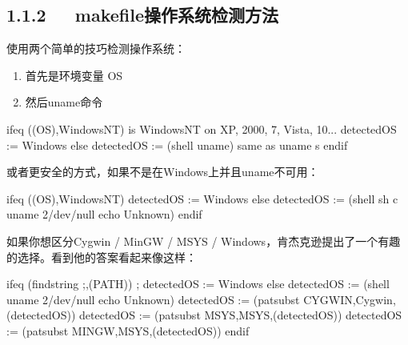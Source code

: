 \documentclass[letterpaper,12pt,english]{sphinxmanual}
\begin{document}
\subsection{1.1.2   makefile操作系统检测方法}
\label{\detokenize{004.study/001._u7f16_u7a0b/001.make/makefile:id3}}
使用两个简单的技巧检测操作系统：
\begin{enumerate}
%
\item {} 
首先是环境变量 OS

\item {} 
然后uname命令

\end{enumerate}

\begin{sphinxVerbatim}[commandchars=\\\{\}]
ifeq (\PYGZdl{}(OS),Windows\PYGZus{}NT)     \PYGZsh{} is Windows\PYGZus{}NT on XP, 2000, 7, Vista, 10...
    detected\PYGZus{}OS := Windows
else
    detected\PYGZus{}OS := \PYGZdl{}(shell uname)  \PYGZsh{} same as \PYGZdq{}uname \PYGZhy{}s\PYGZdq{}
endif
\end{sphinxVerbatim}

或者更安全的方式，如果不是在Windows上并且uname不可用：

\begin{sphinxVerbatim}[commandchars=\\\{\}]
ifeq (\PYGZdl{}(OS),Windows\PYGZus{}NT)
    detected\PYGZus{}OS := Windows
else
    detected\PYGZus{}OS := \PYGZdl{}(shell sh \PYGZhy{}c \PYGZsq{}uname 2\PYGZgt{}/dev/null \textbar{}\textbar{} echo Unknown\PYGZsq{})
endif
\end{sphinxVerbatim}

如果你想区分Cygwin / MinGW / MSYS / Windows，肯杰克逊提出了一个有趣的选择。看到他的答案看起来像这样：

\begin{sphinxVerbatim}[commandchars=\\\{\}]
ifeq \PYGZsq{}\PYGZdl{}(findstring ;,\PYGZdl{}(PATH))\PYGZsq{} \PYGZsq{};\PYGZsq{}
    detected\PYGZus{}OS := Windows
else
    detected\PYGZus{}OS := \PYGZdl{}(shell uname 2\PYGZgt{}/dev/null \textbar{}\textbar{} echo Unknown)
    detected\PYGZus{}OS := \PYGZdl{}(patsubst CYGWIN\PYGZpc{},Cygwin,\PYGZdl{}(detected\PYGZus{}OS))
    detected\PYGZus{}OS := \PYGZdl{}(patsubst MSYS\PYGZpc{},MSYS,\PYGZdl{}(detected\PYGZus{}OS))
    detected\PYGZus{}OS := \PYGZdl{}(patsubst MINGW\PYGZpc{},MSYS,\PYGZdl{}(detected\PYGZus{}OS))
endif
\end{sphinxVerbatim}
\end{document}
